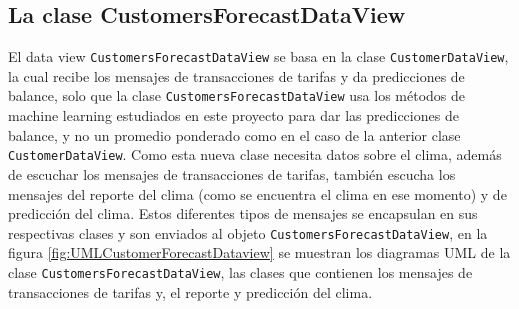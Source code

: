 \subsection{La clase CustomersForecastDataView}

El data view \texttt{CustomersForecastDataView} se basa en la clase \texttt{CustomerDataView}, la cual recibe los mensajes de transacciones de tarifas y da predicciones de balance, solo que la clase \texttt{CustomersForecastDataView} usa los métodos de machine learning estudiados en este proyecto para dar las predicciones de balance, y no un promedio ponderado como en el caso de la anterior clase \texttt{CustomerDataView}. Como esta nueva clase necesita datos sobre el clima, además de escuchar los mensajes de transacciones de tarifas, también escucha los mensajes del reporte del clima (como se encuentra el clima en ese momento) y de predicción del clima. Estos diferentes tipos de mensajes se encapsulan en sus respectivas clases y son enviados al objeto \texttt{CustomersForecastDataView}, en la figura \ref{fig:UMLCustomerForecastDataview} se muestran los diagramas UML de la clase \texttt{CustomersForecastDataView}, las clases que contienen los mensajes de transacciones de tarifas y, el reporte y predicción del clima.

